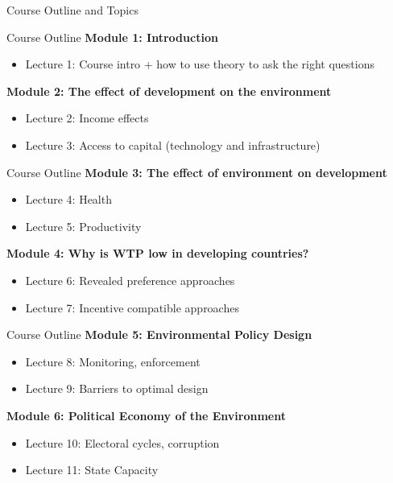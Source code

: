 \documentclass[
  ignorenonframetext,
  aspectratio=169]{beamer}
\providecommand{\tightlist}{%
  \setlength{\itemsep}{0pt}\setlength{\parskip}{0pt}}
\begin{document}
\begin{frame}{}
\protect\hypertarget{section-2}{}
\centering

\huge Course Outline and Topics
\end{frame}

\begin{frame}{Course Outline}
\protect\hypertarget{course-outline}{}
\textbf{Module 1: Introduction}

\begin{itemize}
\tightlist
\item
  Lecture 1: Course intro + how to use theory to ask the right questions
\end{itemize}

\vfill

\textbf{Module 2: The effect of development on the environment}

\begin{itemize}
\tightlist
\item
  Lecture 2: Income effects
\item
  Lecture 3: Access to capital (technology and infrastructure)
\end{itemize}
\end{frame}

\begin{frame}{Course Outline}
\protect\hypertarget{course-outline-1}{}
\textbf{Module 3: The effect of environment on development}

\begin{itemize}
\tightlist
\item
  Lecture 4: Health
\item
  Lecture 5: Productivity \vfill
\end{itemize}

\textbf{Module 4: Why is WTP low in developing countries?}

\begin{itemize}
\tightlist
\item
  Lecture 6: Revealed preference approaches
\item
  Lecture 7: Incentive compatible approaches
\end{itemize}
\end{frame}

\begin{frame}{Course Outline}
\protect\hypertarget{course-outline-2}{}
\textbf{Module 5: Environmental Policy Design}

\begin{itemize}
\tightlist
\item
  Lecture 8: Monitoring, enforcement
\item
  Lecture 9: Barriers to optimal design \vfill
\end{itemize}

\textbf{Module 6: Political Economy of the Environment}

\begin{itemize}
\tightlist
\item
  Lecture 10: Electoral cycles, corruption
\item
  Lecture 11: State Capacity
\end{itemize}
\end{frame}
\end{document}
